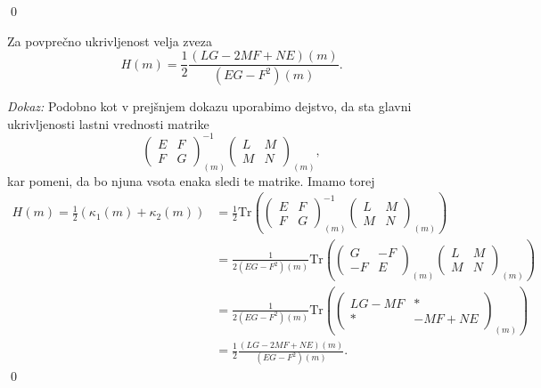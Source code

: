 \qed

\begin{izrek}
\label{izr_izrazava_povprecne_ukrivljenosti}
 Za povprečno ukrivljenost velja zveza \begin{equation*}
 H(m) = \frac{1}{2} \frac{(LG - 2MF + NE)(m)}{(EG - F^2)(m)}.
 \end{equation*}  
\end{izrek}
\noindent
{\em Dokaz:\/}
Podobno kot v prejšnjem dokazu uporabimo dejstvo, da sta glavni ukrivljenosti lastni vrednosti matrike \begin{equation*}
  \begin{pmatrix}
    E & F \\
    F & G
    \end{pmatrix}_{(m)}^{-1}\begin{pmatrix}
    L & M \\
    M & N
    \end{pmatrix}_{(m)},
  \end{equation*}  
kar pomeni, da bo njuna vsota enaka sledi te matrike. Imamo torej \begin{align*}
  H(m) = \frac{1}{2}(\kappa_1(m) + \kappa_2(m)) &= \frac{1}{2} \mathrm{Tr} \left( \begin{pmatrix}
    E & F \\
    F & G
    \end{pmatrix}_{(m)}^{-1}\begin{pmatrix}
    L & M \\
    M & N
    \end{pmatrix}_{(m)} \right)   \\
     &= \frac{1}{2(EG - F^2)(m)} \mathrm{Tr} \left(  \begin{pmatrix}
      G & -F \\
      -F & E
      \end{pmatrix}_{(m)} \begin{pmatrix}
      L & M \\
      M & N
      \end{pmatrix}_{(m)} \right) \\
      &=  \frac{1}{2(EG - F^2)(m)} \mathrm{Tr} \left( \begin{pmatrix}
        LG - MF & * \\
        * & -MF + NE
        \end{pmatrix}_{(m)} \right) \\
        &= \frac{1}{2} \frac{(LG - 2MF + NE)(m)}{(EG - F^2)(m)}.
\end{align*}
\qed


